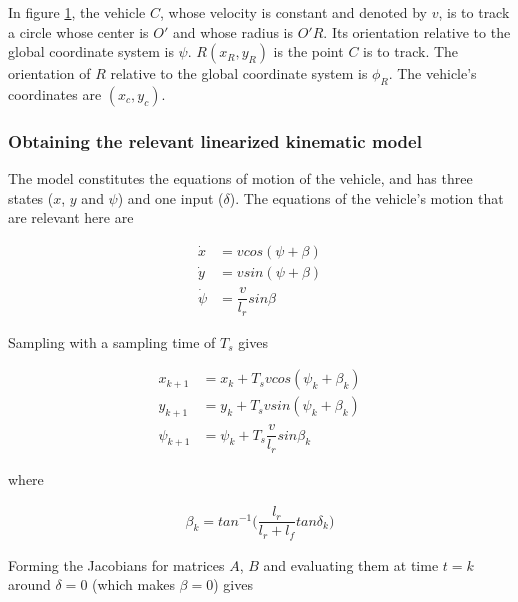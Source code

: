 In figure \ref{fig:circular_mpc}, the vehicle $C$, whose velocity is constant
and denoted by $v$, is to track a circle whose center is $O'$ and whose
radius is $O'R$. Its orientation relative to the global coordinate system is
$\psi$. $R(x_R, y_R)$ is the point $C$ is to track. The orientation of $R$
relative to the global coordinate system is $\phi_R$. The vehicle's coordinates
are $(x_c, y_c)$.

\begin{figure}[H]\centering
  \scalebox{0.8}{}
  \caption{}
  \label{fig:circular_mpc}
\end{figure}

\subsubsection{Obtaining the relevant linearized kinematic model}

The model constitutes the equations of motion of the vehicle, and has three
states ($x$, $y$ and $\psi$) and one input ($\delta$). The equations of the
vehicle's motion that are relevant here are

\begin{align}
  \dot{x} &= v cos(\psi + \beta) \\
  \dot{y} &= v sin(\psi + \beta) \\
  \dot{\psi} &= \dfrac{v}{l_r} sin\beta
\end{align}

Sampling with a sampling time of $T_s$ gives

\begin{align}
  x_{k+1} &= x_{k} + T_s v cos(\psi_k + \beta_k) \\
  y_{k+1} &= y_{k} + T_s v sin(\psi_k + \beta_k) \\
  \psi_{k+1} &= \psi_{k} + T_s \dfrac{v}{l_r} sin\beta_k
\end{align}

where

\begin{align}
  \beta_k = tan^{-1}\Big(\dfrac{l_r}{l_r + l_f} tan\delta_k\Big)
\end{align}


Forming the Jacobians for matrices $A$, $B$ and evaluating them at time
$t=k$ around $\delta = 0$ (which makes $\beta = 0$) gives

